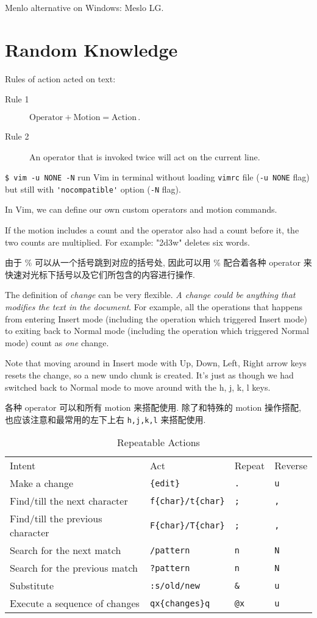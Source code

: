 \documentclass{article}
\begin{document}
Menlo alternative on Windows: Meslo LG. 
\part{Random Knowledge}
Rules of action acted on text:
\begin{description}
  \item[Rule 1] $\text{Operator} + \text{Motion} = \text{Action}\,.$
  \item[Rule 2] An operator that is invoked twice will act on the current line.
\end{description}

  \verb|$ vim -u NONE -N| run Vim in terminal without loading \verb|vimrc| file (\verb|-u NONE| flag) but still with \verb|'nocompatible'| option (\verb|-N| flag).

In Vim, we can define our own custom operators and motion commands.

If the motion includes a count and the operator also had a count before it, the two counts are multiplied. For example: "2d3w" deletes six words.

由于 \% 可以从一个括号跳到对应的括号处, 因此可以用 \% 配合着各种 operator 来快速对光标下括号以及它们所包含的内容进行操作.

The definition of \emph{change} can be very flexible. \emph{A change could be anything that modifies the text in the document}. For example, all the operations that happens from entering Insert mode (including the operation which triggered Insert mode) to exiting back to Normal mode (including the operation which triggered Normal mode) count as \emph{one} change.

Note that moving around in Insert mode with Up, Down, Left, Right arrow keys resets the change, so a new undo chunk is created. It's just as though we had switched back to Normal mode to move around with the h, j, k, l keys.

各种 operator 可以和所有 motion 来搭配使用. 除了和特殊的 motion 操作搭配, 也应该注意和最常用的左下上右 \verb|h,j,k,l| 来搭配使用.

\begin{table}
  \centering
 \begin{tabular}{llll}
  Intent&Act&Repeat&Reverse\\
  Make a change&\verb|{edit}|&\verb|.|&\verb|u|\\
  Find/till the next character&\verb|f{char}/t{char}|&\verb|;|&\verb|,|\\
  Find/till the previous character&\verb|F{char}/T{char}|&\verb|;|&\verb|,|\\
  Search for the next match&\verb|/pattern|&\verb|n|&\verb|N|\\
  Search for the previous match&\verb|?pattern|&\verb|n|&\verb|N|\\
  Substitute&\verb|:s/old/new|&\verb|&|&\verb|u|\\
  Execute a sequence of changes&\verb|qx{changes}q|&\verb|@x|&\verb|u|
\end{tabular}
  \caption{Repeatable Actions}
  \label{tab:RepeatableActions}
\end{table}
\end{document}
